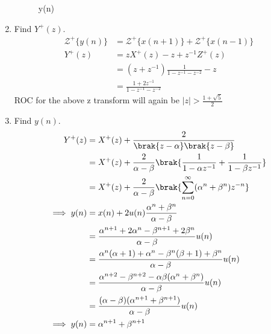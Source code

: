 \documentclass[journal,12pt,twocolumn]{IEEEtran}
\renewcommand\thesection{\arabic{section}}
\begin{document}
\begin{enumerate}[label=\thesection.\arabic*,ref=\thesection.\theenumi]
\begin{figure}
    \caption{y(n)}
    \label{fig:yn}
\end{figure}
\item Find $Y^{+}(z)$. \\
\solution \begin{align}
    \mathcal{Z}^+\{y(n)\} &= \mathcal{Z}^+\{x(n+1)\}+\mathcal{Z}^+\{x(n-1)\}\\
    Y^+(z) &= zX^+(z)-z+z^{-1}Z^+(z)\\
    &= (z+z^{-1})\frac{1}{1-z^{-1}-z^{-2}}-z\\
    &= \frac{1+2z^{-1}}{1-z^{-1}-z^{-2}}
\end{align}
ROC for the above z transform will again be $|z|>\frac{1+\sqrt{5}}{2}$

\item Find $y(n)$.\\
\solution \begin{align}
    Y^+(z) &= X^+(z) + \frac{2}{\brak{z-\alpha}\brak{z-\beta}}\\
    &= X^+(z) + \frac{2}{\alpha-\beta}\brak{\frac{1}{1-\alpha z^{-1}}+\frac{1}{1-\beta z^{-1}}}\\
    &= X^+(z) +\frac{2}{\alpha-\beta}\brak{\sum_{n=0}^{\infty} (\alpha^n+\beta^n)z^{-n}}\\
    \implies y(n)&= x(n)+2u(n)\frac{\alpha^n+\beta^n}{\alpha-\beta}\\
    &= \frac{\alpha^{n+1}+2\alpha^n - \beta^{n+1}+2\beta^{n}}{\alpha-\beta}u(n)\\
    &= \frac{\alpha^n(\alpha+1)+\alpha^n-\beta^n(\beta+1)+\beta^n}{\alpha-\beta}u(n)\\
    &= \frac{\alpha^{n+2}-\beta^{n+2}-\alpha\beta(\alpha^n+\beta^n)}{\alpha-\beta}u(n)\\
    &= \frac{(\alpha-\beta)(\alpha^{n+1}+\beta^{n+1})}{\alpha-\beta}u(n)\\
    \implies y(n) &= \alpha^{n+1}+\beta^{n+1}\label{eq:yn}
\end{align}

\end{enumerate}
\end{document}
